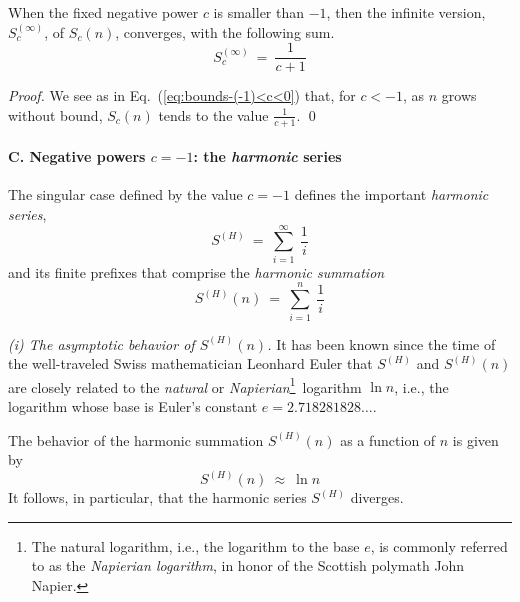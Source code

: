\begin{prop}
\label{thm:bounds-negative-(not-1)-sum-xc}
When the fixed negative power $c$ is smaller than $-1$, then the infinite version, $S_c^{(\infty)}$, of $S_c(n)$, converges, with the following sum.
\begin{equation}
\label{eq:bounds-negative-(not-1)-sum-xc}
S_c^{(\infty)} \ = \ \frac{1}{c+1}
\end{equation}
\end{prop}

\begin{proof}
We see as in Eq.~(\ref{eq:bounds-(-1)<c<0}) that, for $c<-1$, as $n$ grows without bound, $S_c(n)$ tends to the value ${\displaystyle \frac{1}{c+1}}$.  \qed
\end{proof}

\paragraph{C. Negative powers $c = -1$: the {\em harmonic} series}

The singular case defined by the value $c = -1$ defines the important {\it harmonic series},
\[ S^{(H)} \ = \ \sum_{i=1}^\infty \ \frac{1}{i} \]
and its finite prefixes that comprise the {\it harmonic summation}
\[ S^{(H)}(n) \ = \ \sum_{i=1}^n \ \frac{1}{i} \]

\smallskip

 
 
{\it (i) The asymptotic behavior of $S^{(H)}(n)$.}
It has been known since the time of the well-traveled Swiss mathematician Leonhard Euler that $S^{(H)}$ and $S^{(H)}(n)$ are closely related to the {\em natural} or {\it Napierian}\footnote{The natural logarithm, i.e., the logarithm to the base $e$, is commonly referred to as the {\it Napierian logarithm}, in honor of the Scottish polymath John Napier.}~logarithm $\ln n$, i.e., the logarithm whose base is Euler's constant $e = 2.718281828 \ldots$.

\begin{prop}
\label{thm:harmonic}
The behavior of the harmonic summation $S^{(H)}(n)$ as a function of $n$ is given by
\[ S^{(H)}(n) \ \approx \ \ln n \]
It follows, in particular, that the harmonic series $S^{(H)}$ diverges.
\end{prop}

\bigskip

